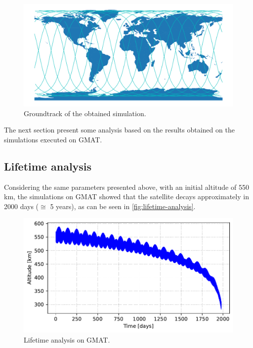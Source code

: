 \begin{figure}[!ht]
    \begin{center}
        \includegraphics[width=\columnwidth]{figures/fsat2-gmat-groundtrack.pdf}
        \caption{Groundtrack of the obtained simulation.}
        \label{fig:fsat2-gmat-groundtrack}
    \end{center}
\end{figure}

The next section present some analysis based on the results obtained on the simulations executed on GMAT.


\subsection{Lifetime analysis}

Considering the same parameters presented above, with an initial altitude of 550 km, the simulations on GMAT showed that the satellite decays approximately in 2000 days ($\cong$ 5 years), as can be seen in \autoref{fig:lifetime-analysis}.

\begin{figure}[!ht]
    \begin{center}
        \includegraphics[width=\columnwidth]{curves/lifetime.pdf}
        \caption{Lifetime analysis on GMAT.}
        \label{fig:lifetime-analysis}
    \end{center}
\end{figure}

